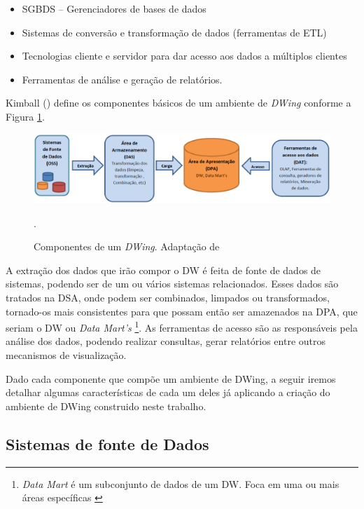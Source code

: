 \begin{itemize}
\item SGBDS – Gerenciadores de bases de dados
\item Sistemas de conversão e transformação de dados (ferramentas de ETL)
\item Tecnologias cliente e servidor para dar acesso aos dados a múltiplos clientes
\item Ferramentas de análise e geração de relatórios.
\end{itemize}


Kimball (\citeyear{kimball2002}) define os componentes básicos de um ambiente de \emph{DWing} conforme a Figura \ref{componentesdw}.

 \begin{figure}[!htb]
 	\centering
 		\includegraphics[scale=0.5]{figuras/componentesDW}
 		\caption{Componentes de um \emph{DWing}. Adaptação de \cite{kimball2002}}.
 		\label{componentesdw}
 \end{figure}


 A extração dos dados que irão compor o DW é feita de fonte de dados de sistemas, podendo ser de um ou vários sistemas relacionados. Esses dados são tratados na DSA, onde podem ser combinados, limpados ou transformados, tornado-os mais consistentes para que possam então ser amazenados na DPA, que seriam o DW ou \emph{Data Mart's}
 \footnote{\emph{Data Mart} é um subconjunto de dados de um DW. Foca em uma ou mais áreas específicas \cite{kimball2002}}. 
 As ferramentas de acesso são as responsáveis pela análise dos dados, podendo realizar consultas, gerar relatórios entre outros mecanismos de visualização.

Dado cada componente que compõe um ambiente de DWing, a seguir iremos detalhar algumas características de cada um deles já aplicando a criação do ambiente de DWing construido neste trabalho.

\subsection{Sistemas de fonte de Dados}

